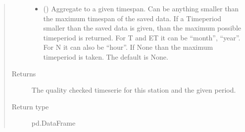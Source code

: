 \documentclass[letterpaper,10pt,english]{sphinxmanual}
\begin{document}
\begin{fulllineitems}
\begin{fulllineitems}
\begin{quote}
\begin{description}
\begin{itemize}
\item {} 
\sphinxAtStartPar
{} (\sphinxstyleliteralemphasis{\sphinxupquote{, }}) \textendash{} Aggregate to a given timespan.
Can be anything smaller than the maximum timespan of the saved data.
If a Timeperiod smaller than the saved data is given, than the maximum possible timeperiod is returned.
For T and ET it can be “month”, “year”.
For N it can also be “hour”.
If None than the maximum timeperiod is taken.
The default is None.

\end{itemize}

\item[{Returns}] \leavevmode
\sphinxAtStartPar
The quality checked timeserie for this station and the given period.

\item[{Return type}] \leavevmode
\sphinxAtStartPar
pd.DataFrame

\end{description}\end{quote}

\end{fulllineitems}


\begin{fulllineitems}
\label{\detokenize{weatherDB:weatherDB.station.StationBase.get_raster_value}}
\end{fulllineitems}



\end{fulllineitems}
\end{document}

